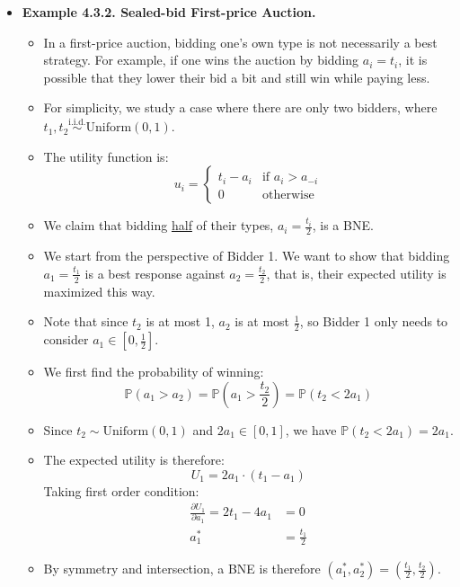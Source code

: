 \documentclass[notitlepage]{article}
\begin{document}
\begin{itemize}
    \item \textbf{Example 4.3.2. Sealed-bid First-price Auction.}
    \begin{itemize}
        \item In a first-price auction, bidding one's own type is not necessarily a best strategy. For example, if one wins the auction by bidding \(a_i = t_i\), it is possible that they lower their bid a bit and still win while paying less.
        \item For simplicity, we study a case where there are only two bidders, where \(t_1, t_2 \overset{\mathrm{i.i.d.}}{\sim}\text{Uniform}(0,1)\).
        \item The utility function is:
        \[
        u_i = 
        \begin{cases}
            t_i - a_i & \text{if } a_i > a_{-i} \\
            0 & \text{otherwise}
        \end{cases}
        \]
        \item We claim that bidding \underline{half} of their types, \(a_i = \frac{t_i}{2}\), is a BNE.
        \item We start from the perspective of Bidder 1. We want to show that bidding \(a_1 = \frac{t_1}{2}\) is a best response against \(a_2 = \frac{t_2}{2}\), that is, their expected utility is maximized this way.
        \item Note that since \(t_2\) is at most 1, \(a_2\) is at most \(\frac{1}{2}\), so Bidder 1 only needs to consider \(a_1 \in [0,\frac{1}{2}]\).
        \item We first find the probability of winning:
        \[
        \mathbb{P}(a_1 > a_2) = \mathbb{P}(a_1 > \frac{t_2}{2}) = \mathbb{P}(t_2 < 2a_1)
        \]
        \item Since \(t_2 \sim \text{Uniform}(0,1)\) and \(2a_1 \in [0,1]\), we have \(\mathbb{P}(t_2 < 2a_1) = 2a_1\).
        \item The expected utility is therefore:
        \[
        U_1 = 2a_1 \cdot (t_1 - a_1)
        \]
        Taking first order condition:
        \begin{align*}
            \frac{\partial U_1}{\partial a_1} = 2t_1 - 4a_1 &= 0 \\
            a_1^* &= \frac{t_1}{2}
        \end{align*}
        \item By symmetry and intersection, a BNE is therefore \((a_1^*, a_2^*) = (\frac{t_1}{2}, \frac{t_2}{2})\).
    \end{itemize}

\end{itemize}
\end{document}
